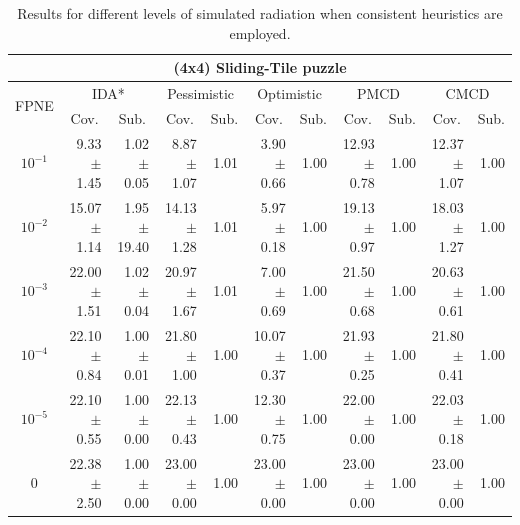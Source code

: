 \documentclass[letterpaper]{article}
\begin{document}
\begin{table}[t]
\begin{tabular}{| c | r  r | r  r | r  r | r  r | r  r |}
\hline
\hline
\multicolumn{11}{|c|}{\textbf{(4x4) Sliding-Tile puzzle}} \\
\hline
\multirow{2}{*}{FPNE}	& \multicolumn{2}{|c|}{IDA*} 	& \multicolumn{2}{|c|}{Pessimistic} 	& \multicolumn{2}{|c|}{Optimistic} 	& \multicolumn{2}{|c|}{PMCD} 	& \multicolumn{2}{|c|}{CMCD} 	\\
\cline{2-11}
	& \multicolumn{1}{c}{Cov.} & \multicolumn{1}{c|}{Sub.} 	& \multicolumn{1}{c}{Cov.} & \multicolumn{1}{c|}{Sub.} 	& \multicolumn{1}{c}{Cov.} & \multicolumn{1}{c|}{Sub.} 	& \multicolumn{1}{c}{Cov.} & \multicolumn{1}{c|}{Sub.} 	& \multicolumn{1}{c}{Cov.} & \multicolumn{1}{c|}{Sub.} 	\\
\hline

$10^{-1}$	& 9.33 $\pm$ 1.45	& 1.02 $\pm$ 0.05	& 8.87 $\pm$ 1.07	& 1.01	& 3.90 $\pm$ 0.66	& 1.00	& 12.93 $\pm$ 0.78	& 1.00	& 12.37 $\pm$ 1.07 & 1.00	\\

$10^{-2}$	& 15.07 $\pm$ 1.14	& 1.95 $\pm$ 19.40	& 14.13 $\pm$ 1.28	& 1.01	& 5.97 $\pm$ 0.18	& 1.00	& 19.13 $\pm$ 0.97	& 1.00	& 18.03 $\pm$ 1.27 & 1.00	\\

$10^{-3}$	& 22.00 $\pm$ 1.51	& 1.02 $\pm$ 0.04	& 20.97 $\pm$ 1.67	& 1.01	& 7.00 $\pm$ 0.69	& 1.00	& 21.50 $\pm$ 0.68	& 1.00	& 20.63 $\pm$ 0.61 & 1.00	\\

$10^{-4}$	& 22.10 $\pm$ 0.84	& 1.00 $\pm$ 0.01	& 21.80 $\pm$ 1.00	& 1.00	& 10.07 $\pm$ 0.37	& 1.00	& 21.93 $\pm$ 0.25	& 1.00	& 21.80 $\pm$ 0.41 & 1.00	\\

$10^{-5}$	& 22.10 $\pm$ 0.55	& 1.00 $\pm$ 0.00	& 22.13 $\pm$ 0.43	& 1.00	& 12.30 $\pm$ 0.75	& 1.00	& 22.00 $\pm$ 0.00	& 1.00	& 22.03 $\pm$ 0.18 & 1.00	\\



0 	& 22.38 $\pm$ 2.50	& 1.00  $\pm$ 0.00 	& 23.00 $\pm$ 0.00 & 1.00  & 23.00 $\pm$ 0.00 & 1.00  & 23.00 $\pm$ 0.00 & 1.00  & 23.00 $\pm$ 0.00 & 1.00 	\\
\hline
\end{tabular}
\caption{Results for different levels of simulated radiation when consistent heuristics are employed.}
\label{tab:results}
\end{table}
\end{document}
